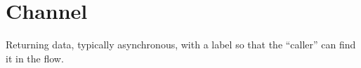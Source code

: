 \section{Channel}
Returning data, typically asynchronous, with a label so that the
``caller'' can find it in the flow.

